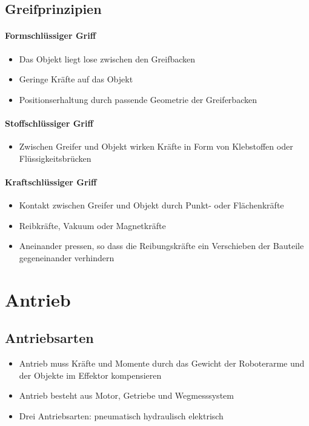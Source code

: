 \subsection{Greifprinzipien}
\paragraph{Formschlüssiger Griff}
\begin{itemize}
	\item Das Objekt liegt lose zwischen den Greifbacken
	\item Geringe Kräfte auf das Objekt
	\item Positionserhaltung durch passende Geometrie der Greiferbacken
\end{itemize}
\paragraph{Stoffschlüssiger Griff}
\begin{itemize}
	\item Zwischen Greifer und Objekt wirken Kräfte in Form von Klebstoffen oder Flüssigkeitsbrücken
\end{itemize}
\paragraph{Kraftschlüssiger Griff}
\begin{itemize}
	\item Kontakt zwischen Greifer und Objekt durch Punkt- oder Flächenkräfte
	\item Reibkräfte, Vakuum oder Magnetkräfte
	\item Aneinander pressen, so dass die Reibungskräfte ein Verschieben der Bauteile gegeneinander verhindern
\end{itemize}
\section{Antrieb}
\subsection{Antriebsarten}
\begin{itemize}
	\item Antrieb muss Kräfte und Momente durch das Gewicht der Roboterarme und der Objekte im Effektor kompensieren
	\item Antrieb besteht aus Motor, Getriebe und Wegmesssystem
	\item Drei Antriebsarten:
	\subitem pneumatisch
	\subitem hydraulisch
	\subitem elektrisch
\end{itemize}
